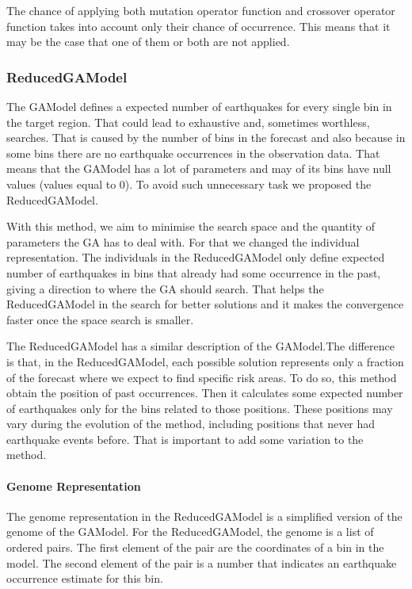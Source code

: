 The chance of applying both mutation operator function and crossover operator function takes into account only their chance of occurrence. This means that it may be the case that one of them or both are not applied.

\subsubsection{ReducedGAModel}\label{ReducedGAModel}
The GAModel defines a expected number of earthquakes for every single bin in the target region. That could lead to exhaustive and, sometimes worthless, searches. That is caused by the number of bins in the forecast and also because in some bins there are no earthquake occurrences in the observation data. That means that the GAModel has a lot of parameters and may of its bins have null values (values equal to 0). To avoid such unnecessary task we proposed the ReducedGAModel.

With this method, we aim to minimise the search space and the quantity of parameters the GA has to deal with. For that we changed the individual representation. The individuals in the ReducedGAModel only define expected number of earthquakes in bins that already had some occurrence in the past, giving a direction to where the GA should search. That helps the ReducedGAModel in the search for better solutions and it makes the convergence faster once the space search is smaller.

The ReducedGAModel has a similar description of the GAModel.The difference is that, in the ReducedGAModel, each possible solution represents only a fraction of the forecast where we expect to find specific risk areas. To do so, this method obtain the position of past occurrences. Then it calculates some expected number of earthquakes only for the bins related to those positions. These positions may vary during the evolution of the method, including positions that never had earthquake events before. That is important to add some variation to the method.


\paragraph{Genome Representation}\label{genomeReduced}
The genome representation in the ReducedGAModel is a simplified version of the genome of the GAModel. For the ReducedGAModel, the genome is a list of ordered pairs. The first element of the pair are the coordinates of a bin in the model. The second element of the pair is a number that indicates an earthquake occurrence estimate for this bin.

